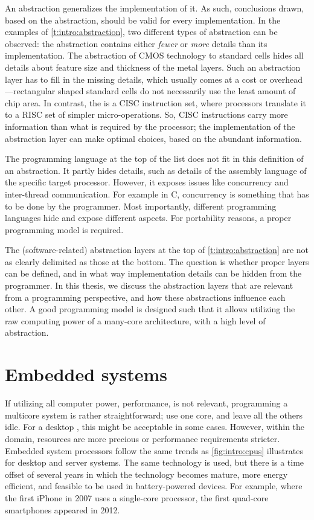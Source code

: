 An abstraction generalizes the implementation of it.
As such, conclusions drawn, based on the abstraction, should be valid for every implementation.
In the examples of \vref{t:intro:abstraction}, two different types of abstraction can be observed: the abstraction contains either \emph{fewer} or \emph{more} details than its implementation.
The abstraction of \ac{CMOS} technology to standard cells hides all details about feature size and thickness of the metal layers.
Such an abstraction layer has to fill in the missing details, which usually comes at a cost or overhead---rectangular shaped standard cells do not necessarily use the least amount of chip area.
In contrast, the \xSixtyFour is a \ac{CISC} instruction set, where processors translate it to a \ac{RISC} set of simpler micro-operations.
So, \ac{CISC} instructions carry more information than what is required by the processor; the implementation of the abstraction layer can make optimal choices, based on the abundant information.

The programming language at the top of the list does not fit in this definition of an abstraction.
It partly hides details, such as details of the assembly language of the specific target processor.
However, it exposes issues like concurrency and inter-thread communication.
For example in C, concurrency is something that has to be done by the programmer.
Most importantly, different programming languages hide and expose different aspects.
For portability reasons, a proper programming model is required.

The (software-related) abstraction layers at the top of \vref{t:intro:abstraction} are not as clearly delimited as those at the bottom.
The question is whether proper layers can be defined, and in what way implementation details can be hidden from the programmer.
In this thesis, we discuss the abstraction layers that are relevant from a programming perspective, and how these abstractions influence each other.
A good programming model is designed such that it allows utilizing the raw computing power of a many-core architecture, with a high level of abstraction.


\section{Embedded systems}

If utilizing all computer power, \ie performance, is not relevant, programming a multicore system is rather straightforward; use one core, and leave all the others idle.
For a desktop , this might be acceptable in some cases.
However, within the  domain, resources are more precious or performance requirements stricter.
Embedded system processors follow the same trends as \vref{fig:intro:cpus} illustrates for desktop and server systems.
The same technology is used, but there is a time offset of several years in which the technology becomes mature, more energy efficient, and feasible to be used in battery-powered devices.
For example, where the first iPhone in 2007 uses a single-core  processor, the first quad-core smartphones appeared in 2012.

